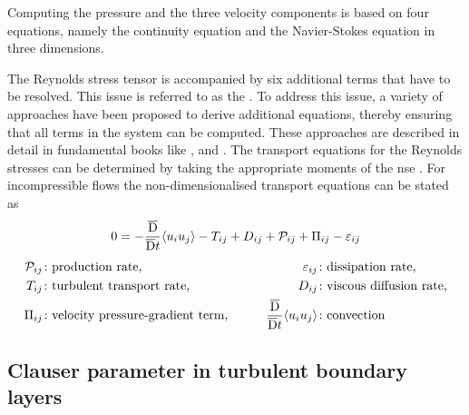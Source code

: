 Computing the pressure and the three velocity components is based on four equations, namely the continuity equation and the Navier-Stokes equation in three dimensions.

The Reynolds stress tensor is accompanied by six additional terms that have to be resolved.
This issue is referred to as the  \citep{wilcox_turbulence_2006}.
%
To address this issue, a variety of approaches have been proposed to derive additional equations, thereby ensuring that all terms in the system can be computed.
These approaches are described in detail in fundamental books like \citet{wilcox_turbulence_2006}, \citet{pope_turbulent_2015} and \citet{moin_fundamentals_2024}.
The transport equations for the Reynolds stresses can be determined by taking the appropriate moments of the \acrshort{nse} \citep{mansour_reynolds-stress_1988}.
For incompressible flows the non-dimensionalised transport equations can be stated as 
\begin{gather}
    0 = -\frac{\overline{\mathrm{D}}}{\overline{\mathrm{D}}t} \langle u_i u_j \rangle - T_{ij} + D_{ij} + \mathcal{P}_{ij} + \Pi_{ij} - \varepsilon_{ij} \\[4pt]
    \begin{aligned}
        \mathcal{P}_{ij} &\colon \text{production rate,} & \quad \varepsilon_{ij} &\colon \text{dissipation rate,} \\
        T_{ij} &\colon \text{turbulent transport rate,} & \quad D_{ij} &\colon \text{viscous diffusion rate,} \\
        \Pi_{ij} &\colon \text{velocity pressure-gradient term,} & \qquad \frac{\overline{\mathrm{D}}}{\overline{\mathrm{D}}t} \langle u_i u_j \rangle &\colon \text{convection}
    \end{aligned} \notag
\end{gather}

\newpage
\subsection{Clauser parameter in turbulent boundary layers} \label{subsec:clauser}

